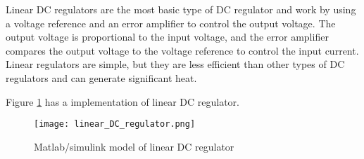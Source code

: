 Linear DC regulators are the most basic type of DC regulator and work by using a voltage reference and an error amplifier to control the output voltage. The output voltage is proportional to the input voltage, and the error amplifier compares the output voltage to the voltage reference to control the input current. Linear regulators are simple, but they are less efficient than other types of DC regulators and can generate significant heat.

Figure \ref{fig:linear_DC_regulator} has a implementation of linear DC regulator. 


\begin{figure}[]
\texttt{[image: linear\_DC\_regulator.png]}
\label{fig:linear_DC_regulator}
\caption{Matlab/simulink model of linear DC regulator}
\end{figure}



\begin{comment}

potential sources
https://en.wikipedia.org/wiki/Linear_regulator

\end{comment}